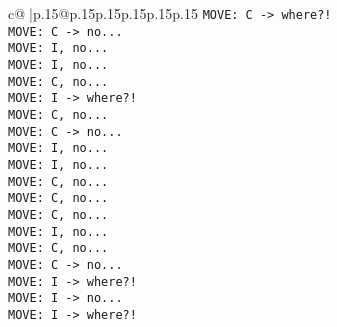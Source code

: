 \documentclass{article}
\begin{document}
{\begin{supertabular}{c@{$\;$}|p{.15\linewidth}@{}p{.15\linewidth}p{.15\linewidth}p{.15\linewidth}p{.15\linewidth}p{.15\linewidth}}
{{{\tt  MOVE: C -> where?!\\ \tt  MOVE: C -> no...\\ \tt  MOVE: I, no...\\ \tt  MOVE: I, no...\\ \tt  MOVE: C, no...\\ \tt  MOVE: I -> where?!\\ \tt  MOVE: C, no...\\ \tt  MOVE: C -> no...\\ \tt  MOVE: I, no...\\ \tt  MOVE: I, no...\\ \tt  MOVE: C, no...\\ \tt  MOVE: C, no...\\ \tt  MOVE: C, no...\\ \tt  MOVE: I, no...\\ \tt  MOVE: C, no...\\ \tt  MOVE: C -> no...\\ \tt  MOVE: I -> where?!\\ \tt  MOVE: I -> no...\\ \tt  MOVE: I -> where?!\\}}}
\end{supertabular}}
\end{document}
